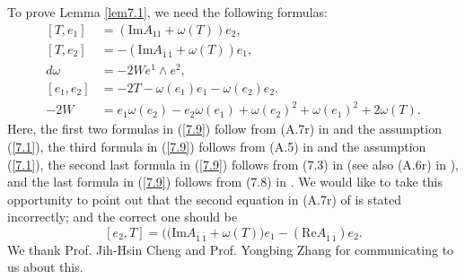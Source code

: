 \documentclass{amsart}
\theoremstyle{Corollary}
\numberwithin{equation}{section}
\begin{document}
To prove Lemma \ref{lem7.1}, we need the following formulas: 
\begin{equation}\label{7.9}
\begin{split}
[T,e_1] & =(\mbox{Im}A_{11}+\omega(T))e_2, \\
[T,e_2] & =-(\mbox{Im}A_{\overline{1}\,\overline{1}}+\omega(T))e_1,\\
d\omega&=-2We^1\wedge e^2,\\
[e_1,e_2]&=-2T-\omega(e_1)e_1-\omega(e_2)e_2.\\
-2W&=e_1\omega(e_2)-e_2\omega(e_1)+\omega(e_2)^2+\omega(e_1)^2+2\omega(T).
\end{split}
\end{equation}
Here, the first two formulas in (\ref{7.9}) follow from 
(A.7r) in \cite{CHMY} and the assumption (\ref{7.1}),
the third formula in (\ref{7.9}) follows from 
(A.5) in \cite{CHMY}
and the assumption (\ref{7.1}), 
the second last formula in (\ref{7.9}) follows from 
(7.3) in \cite{CYZ} (see also (A.6r) in \cite{CHMY}), 
and the last formula in (\ref{7.9}) follows from 
(7.8) in \cite{CYZ}. 
We would like to take this opportunity to point out that the second equation 
in (A.7r) of \cite{CHMY} is stated incorrectly; and the correct 
one should be
$$[e_2,T]=\big((\mbox{Im}A_{\overline{1}\,\overline{1}}+\omega(T)\big)e_1-(\mbox{Re}A_{\overline{1}\,\overline{1}})e_2.$$
We thank Prof. Jih-Hsin Cheng and Prof. Yongbing Zhang 
for communicating to us about this. 
\end{document}
